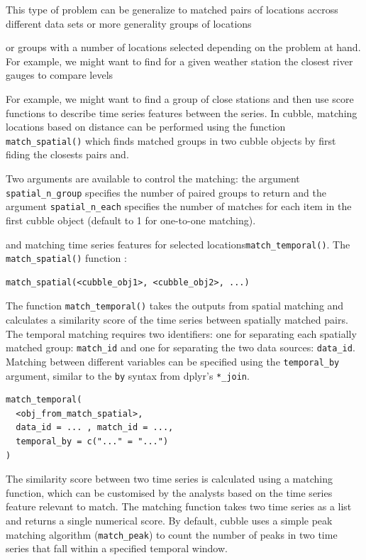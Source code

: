 \documentclass[
  shortnames]{jss}
\begin{document}
This type of problem can be generalize to matched pairs of locations accross different data sets or more generality groups of locations

or groups with a number of locations selected depending on the problem at hand. For example, we might want to find for a given weather station the closest river gauges to compare levels

For example, we might want to find a group of close stations and then use score functions to describe time series features between the series. In cubble, matching locations based on distance can be performed using the function \texttt{match\_spatial()} which finds matched groups in two cubble objects by first fiding the closests pairs and.

Two arguments are available to control the matching: the argument \texttt{spatial\_n\_group} specifies the number of paired groups to return and the argument \texttt{spatial\_n\_each} specifies the number of matches for each item in the first cubble object (default to 1 for one-to-one matching).

and matching time series features for selected locations\texttt{match\_temporal()}. The \texttt{match\_spatial()} function :

\begin{verbatim}
match_spatial(<cubble_obj1>, <cubble_obj2>, ...)
\end{verbatim}

The function \texttt{match\_temporal()} takes the outputs from spatial matching and calculates a similarity score of the time series between spatially matched pairs. The temporal matching requires two identifiers: one for separating each spatially matched group: \texttt{match\_id} and one for separating the two data sources: \texttt{data\_id}. Matching between different variables can be specified using the \texttt{temporal\_by} argument, similar to the \texttt{by} syntax from dplyr's \texttt{*\_join}.

\begin{verbatim}
match_temporal(
  <obj_from_match_spatial>, 
  data_id = ... , match_id = ..., 
  temporal_by = c("..." = "...")
)
\end{verbatim}

The similarity score between two time series is calculated using a matching function, which can be customised by the analysts based on the time series feature relevant to match. The matching function takes two time series as a list and returns a single numerical score. By default, cubble uses a simple peak matching algorithm (\texttt{match\_peak}) to count the number of peaks in two time series that fall within a specified temporal window.
\end{document}
